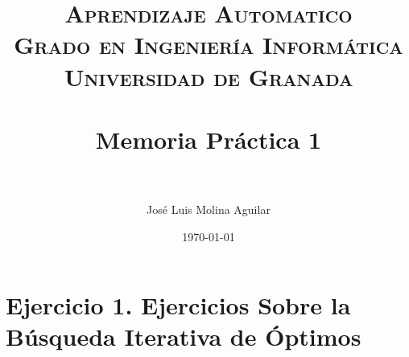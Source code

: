 

\everymath{\displaystyle}

\title{	
\normalfont \normalsize 
\textsc{\textbf{Aprendizaje Automatico} \\ Grado en Ingeniería Informática \\ Universidad de Granada} \\ [25pt] %
\horrule{0.5pt} \\[0.4cm] %
\huge Memoria Práctica 1 \\ %
\horrule{2pt} \\[0.5cm] %
}

\author{José Luis Molina Aguilar} %

\date{\normalsize\today} %




\maketitle %

\newpage %

\tableofcontents %

\listoffigures

\listoftables

\newpage




\section{Ejercicio 1. Ejercicios Sobre la Búsqueda Iterativa de Óptimos}


